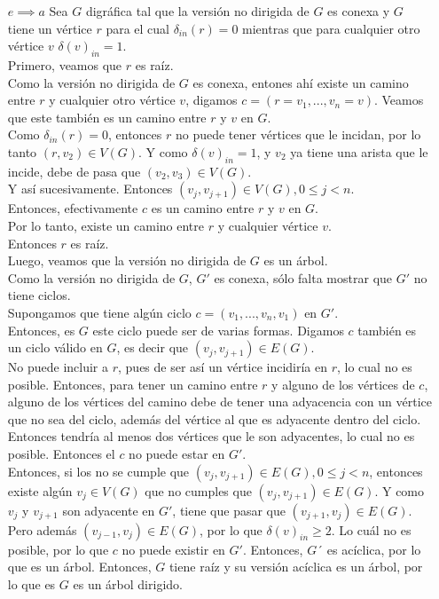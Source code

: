 \documentclass[12pt,a4paper]{report}
\begin{document}
\begin{enumerate}
{\begin{itemize}
				\item[$e \implies a$]{
					Sea $G$ digráfica tal que la versión no dirigida de $G$ es conexa y $G$
					tiene un vértice $r$ para el cual $\delta_{in}(r) = 0$ mientras que para
					cualquier otro vértice $v$ $\delta(v)_{in} = 1$.\\
					Primero, veamos que $r$ es raíz.\\
					Como la versión no dirigida de $G$ es conexa, entones ahí existe un camino
					entre $r$ y cualquier otro vértice $v$, digamos $c = (r = v_1, ..., v_n = v)$.
					Veamos que este también es un camino entre $r$ y $v$ en $G$.\\
					Como $\delta_{in}(r) = 0$, entonces $r$ no puede tener vértices que le incidan,
					por lo tanto $(r, v_2) \in V(G)$. Y como $\delta(v)_{in} = 1$, y $v_2$ ya
					tiene una arista que le incide, debe de pasa que $(v_2, v_3) \in V(G)$.\\
					Y así sucesivamente. Entonces $(v_j, v_{j+1}) \in V(G), 0 \leq j < n$.\\
					Entonces, efectivamente $c$ es un camino entre $r$ y $v$ en $G$.\\
					Por lo tanto, existe un camino entre $r$ y cualquier vértice $v$.\\
					Entonces $r$ es raíz.\\
					Luego, veamos que la versión no dirigida de $G$ es un árbol.\\
					Como la versión no dirigida de $G$, $G'$ es conexa, sólo falta mostrar que
					$G'$ no tiene ciclos.\\
					Supongamos que tiene algún ciclo $c = (v_1, ..., v_n, v_1)$ en $G'$.\\
					Entonces, es $G$ este ciclo puede ser de varias formas. Digamos $c$ también
					es un ciclo válido en $G$, es decir que $(v_j, v_{j+1}) \in E(G)$.\\
					No puede incluir a $r$, pues de ser así un vértice incidiría en $r$, lo
					cual no es posible. Entonces, para tener un camino entre $r$ y alguno de
					los vértices de $c$, alguno de los vértices del camino debe de tener una
					adyacencia con un vértice que no sea del ciclo, además del vértice al que
					es adyacente dentro del ciclo. Entonces tendría al menos dos vértices que
					le son adyacentes, lo cual no es posible. Entonces el $c$ no puede estar
					en $G'$.\\
					Entonces, si los no se cumple que $(v_j, v_{j+1}) \in E(G), 0 \leq j < n$,
					entonces existe algún $v_j \in V(G)$ que no cumples que
					$(v_j, v_{j+1})\in E(G)$. Y como $v_j$ y $v_{j+1}$ son adyacente en $G'$,
					tiene que pasar que $(v_{j+1}, v_j)\in E(G)$.
					Pero además $(v_{j-1}, v_j)\in E(G)$, por lo que $\delta(v)_{in} \geq 2$.
					Lo cuál no es posible, por lo que $c$ no puede existir en $G'$.
					Entonces, $G´$ es acíclica, por lo que es un árbol.
					Entonces, $G$ tiene raíz y su versión acíclica es un árbol, por lo que es
					$G$ es un árbol dirigido.
				}
			\end{itemize}

		}
	\end{enumerate}
\end{document}
